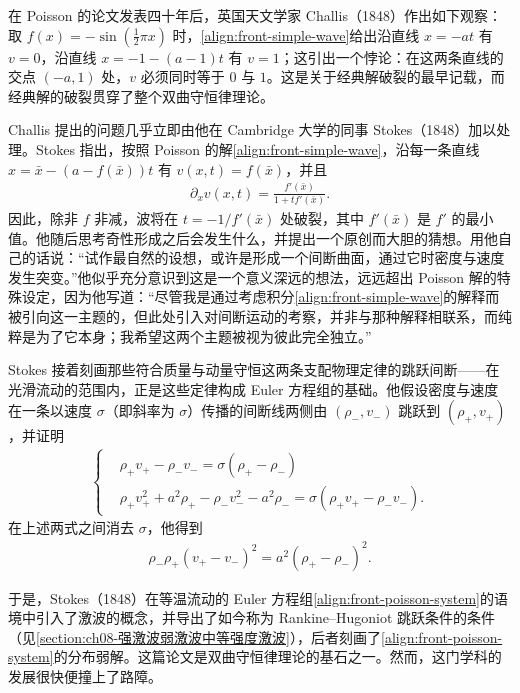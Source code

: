 \documentclass[../../main.tex]{subfiles}
\begin{document}
在 Poisson 的论文发表四十年后，英国天文学家 Challis（1848）作出如下观察：取 $f(x)=-\sin(\tfrac{1}{2}\pi x)$ 时，\eqref{align:front-simple-wave}给出沿直线 $x=-at$ 有 $v=0$，沿直线 $x=-1-(a-1)t$ 有 $v=1$；这引出一个悖论：在这两条直线的交点 $(-a,1)$ 处，$v$ 必须同时等于 $0$ 与 $1$。这是关于经典解破裂的最早记载，而经典解的破裂贯穿了整个双曲守恒律理论。

Challis 提出的问题几乎立即由他在 Cambridge 大学的同事 Stokes（1848）加以处理。Stokes 指出，按照 Poisson 的解\eqref{align:front-simple-wave}，沿每一条直线 $x=\bar{x}-(a-f(\bar{x}))t$ 有 $v(x,t)=f(\bar{x})$，并且
\begin{align}
\partial_x v(x,t)=\frac{f'(\bar{x})}{1+tf'(\bar{x})}.\label{align:front-stokes-derivative}
\end{align}
因此，除非 $f$ 非减，波将在 $t=-1/f'(\bar{x})$ 处破裂，其中 $f'(\bar{x})$ 是 $f'$ 的最小值。他随后思考奇性形成之后会发生什么，并提出一个原创而大胆的猜想。用他自己的话说：“试作最自然的设想，或许是形成一个间断曲面，通过它时密度与速度发生突变。”他似乎充分意识到这是一个意义深远的想法，远远超出 Poisson 解的特殊设定，因为他写道：“尽管我是通过考虑积分\eqref{align:front-simple-wave}的解释而被引向这一主题的，但此处引入对间断运动的考察，并非与那种解释相联系，而纯粹是为了它本身；我希望这两个主题被视为彼此完全独立。”

Stokes 接着刻画那些符合质量与动量守恒这两条支配物理定律的跳跃间断——在光滑流动的范围内，正是这些定律构成 Euler 方程组的基础。他假设密度与速度在一条以速度 $\sigma$（即斜率为 $\sigma$）传播的间断线两侧由 $(\rho_-,v_-)$ 跳跃到 $(\rho_+,v_+)$，并证明
\begin{align}
\left\{\begin{aligned}
&\rho_+v_+-\rho_-v_-=\sigma(\rho_+-\rho_-)\\
&\rho_+v_+^{2}+a^{2}\rho_+-\rho_-v_-^{2}-a^{2}\rho_-=\sigma(\rho_+v_+-\rho_-v_-).
\end{aligned}\right.\label{align:front-stokes-jump}
\end{align}
在上述两式之间消去 $\sigma$，他得到
\begin{align}
\rho_-\rho_+(v_+-v_-)^{2}=a^{2}(\rho_+-\rho_-)^{2}.\label{align:front-stokes-elimination}
\end{align}

于是，Stokes（1848）在等温流动的 Euler 方程组\eqref{align:front-poisson-system}的语境中引入了激波的概念，并导出了如今称为 Rankine--Hugoniot 跳跃条件的条件（见\cref{section:ch08-强激波弱激波中等强度激波}），后者刻画了\eqref{align:front-poisson-system}的分布弱解。这篇论文是双曲守恒律理论的基石之一。然而，这门学科的发展很快便撞上了路障。
\end{document}
